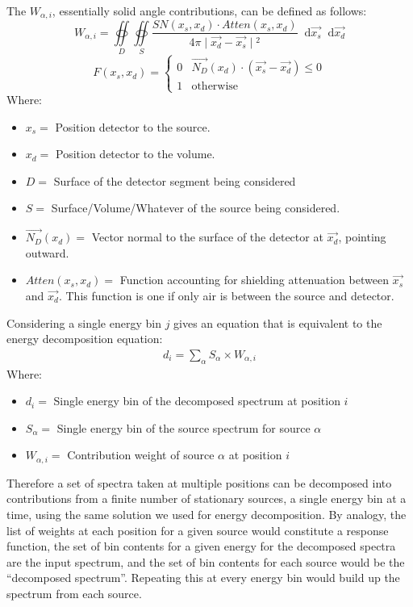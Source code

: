 \documentclass{article}
\newcommand*\dif{\mathop{}\!\mathrm{d}}
\begin{document}
The $W_{\alpha,i}$, essentially solid angle contributions, can be defined as follows:
\begin{equation}
	W_{\alpha,i} = \oiint\limits_{D} \oiint\limits_{S} \frac{SN(x_s, x_d)\cdot{}Atten(x_s, x_d)}{4\pi{} \mid{} \vec{x_d}-\vec{x_s} \mid{}^2} \dif \vec{x_s} \dif \vec{x_d}
\end{equation}
\begin{equation}
	F(x_s, x_d) =
	\begin{cases}
		0 & \vec{N_D}(x_d)\cdot{}(\vec{x_s}-\vec{x_d}) \leq{} 0\\
		1 & \text{otherwise}
	\end{cases}
\end{equation}
Where:
\begin{itemize}
\item $x_s=$ Position detector to the source.
\item $x_d=$ Position detector to the volume.
\item $D=$ Surface of the detector segment being considered
\item $S=$ Surface/Volume/Whatever of the source being considered.
\item $\vec{N_D}(x_d)=$ Vector normal to the surface of the detector at $\vec{x_d}$, pointing outward.
\item $Atten(x_s, x_d)=$ Function accounting for shielding attenuation between $\vec{x_s}$ and $\vec{x_d}$. This function is one if only air is between the source and detector.
\end{itemize}

Considering a single energy bin $j$ gives an equation that is equivalent to the energy decomposition equation:
\begin{align}
	d_{i} = \sum\limits_{\alpha}S_{\alpha}\times{}W_{\alpha,i}
\end{align}
Where:
\begin{itemize}
\item $d_{i}=$ Single energy bin of the decomposed spectrum at position $i$
\item $S_{\alpha}=$ Single energy bin of the source spectrum for source $\alpha$
\item $W_{\alpha,i}=$ Contribution weight of source $\alpha$ at position $i$
\end{itemize}

Therefore a set of spectra taken at multiple positions can be decomposed into contributions from a finite number of stationary sources, a single energy bin at a time, using the same solution we used for energy decomposition. By analogy, the list of weights at each position for a given source would constitute a response function, the set of bin contents for a given energy for the decomposed spectra are the input spectrum, and the set of bin contents for each source would be the ``decomposed spectrum''. Repeating this at every energy bin would build up the spectrum from each source.
\end{document}
